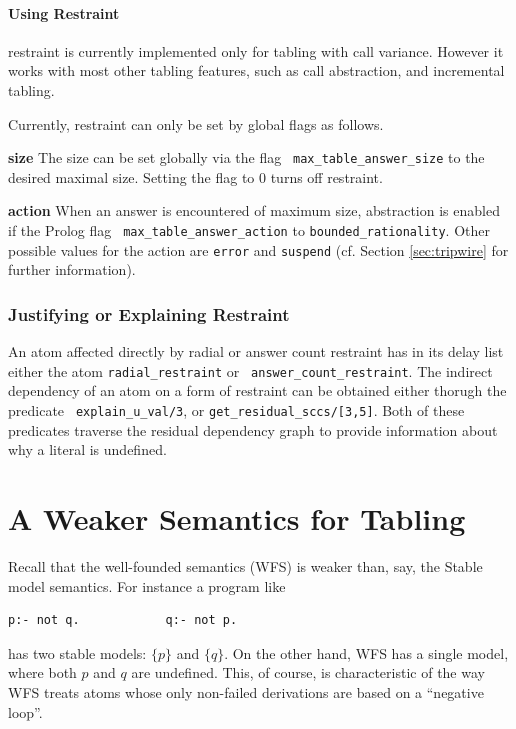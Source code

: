 \paragraph*{Using \MAXANS{} Restraint}
\Maxans{} restraint is currently implemented only for tabling with call
variance.  However it works with most other tabling features, such as
call abstraction, and incremental tabling.

Currently, \maxans{} restraint can only be set by global flags as
follows.
\bi
\item {\bf size} The size can be set globally via the flag {\tt
  max\_table\_answer\_size} to the desired maximal size.  Setting the
  flag to 0 turns off \maxans{} restraint.

\item {\bf action} When an answer is encountered of maximum size,
  abstraction is enabled if the Prolog flag {\tt
    max\_table\_answer\_action} to {\tt bounded\_rationality}.  Other
  possible values for the action are {\tt error} and {\tt suspend}
  (cf. Section \ref{sec:tripwire} for further information).  
\ei

\subsubsection{Justifying or Explaining Restraint}

An atom affected directly by radial or answer count restraint has in
its delay list either the atom {\tt radial\_restraint} or {\tt
  answer\_count\_restraint}.  The indirect dependency of an atom on a
form of restraint can be obtained either thorugh the predicate {\tt
  explain\_u\_val/3}, or {\tt get\_residual\_sccs/[3,5]}.  Both of
these predicates traverse the residual dependency graph to provide
information about why a literal is undefined.




\section{A Weaker Semantics for Tabling}
%
Recall that the well-founded semantics (WFS) is weaker than, say,
the Stable model semantics.  For instance a program like
%
\begin{verbatim}
p:- not q.            q:- not p.
\end{verbatim}
%
has two stable models: $\{p\}$ and $\{q\}$.  On the other hand, WFS
has a single model, where both $p$ and $q$ are undefined.  This, of
course, is characteristic of the way WFS treats atoms whose only
non-failed derivations are based on a ``negative loop''.

